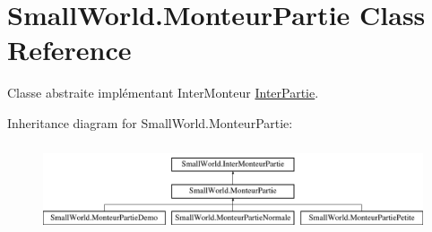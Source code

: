 \hypertarget{class_small_world_1_1_monteur_partie}{\section{Small\-World.\-Monteur\-Partie Class Reference}
\label{class_small_world_1_1_monteur_partie}
}


Classe abstraite implémentant Inter\-Monteur \hyperlink{interface_small_world_1_1_inter_partie}{Inter\-Partie}.  


Inheritance diagram for Small\-World.\-Monteur\-Partie\-:\begin{figure}[H]
\begin{center}
\leavevmode
\includegraphics[height=2.616822cm]{class_small_world_1_1_monteur_partie}
\end{center}
\end{figure}
